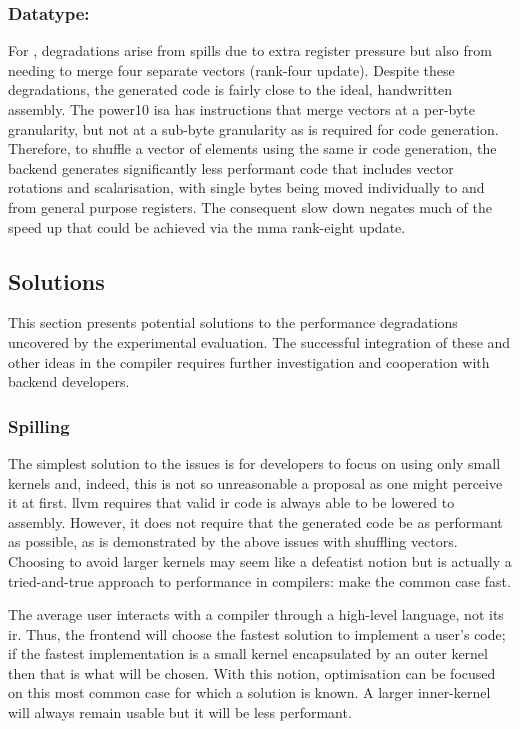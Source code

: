 \documentclass[\main/thesis.tex]{subfiles}
\begin{document}
\subsubsection{Datatype: \texorpdfstring{}{i4}}
For , degradations arise from \glspl{spill} due to extra register pressure but also from needing to merge four separate vectors (rank-four update).
Despite these degradations, the generated code is fairly close to the ideal, handwritten assembly.
The \gls{power10} \gls{isa} has instructions that merge vectors at a per-byte granularity, but not at a sub-byte granularity as is required for  code generation.
Therefore, to shuffle a vector of  elements using the same \gls{ir} code generation, the backend generates significantly less performant code that includes vector rotations and scalarisation, with single bytes being moved individually to and from general purpose registers.
The consequent slow down negates much of the speed up that could be achieved via the \gls{mma} rank-eight update.

\subsection{Solutions}
This section presents potential solutions to the performance degradations uncovered by the experimental evaluation.
The successful integration of these and other ideas in the compiler requires further investigation and cooperation with backend developers.

\subsubsection{Spilling}
\label{sec:spillSolution}
The simplest solution to the  issues is for developers to focus on using only small kernels and, indeed, this is not so unreasonable a proposal as one might perceive it at first.
\gls{llvm} requires that valid \gls{ir} code is always able to be lowered to assembly.
However, it does not require that the generated code be as performant as possible, as is demonstrated by the above issues with shuffling  vectors.
Choosing to avoid larger kernels may seem like a defeatist notion but is actually a tried-and-true approach to performance in compilers: make the common case fast.

The average user interacts with a compiler through a high-level language, not its \gls{ir}.
Thus, the frontend will choose the fastest solution to implement a user's code; if the fastest implementation is a small kernel encapsulated by an outer kernel then that is what will be chosen.
With this notion, optimisation can be focused on this most common case for which a solution is known.
A larger inner-kernel will always remain usable but it will be less performant.
\end{document}
